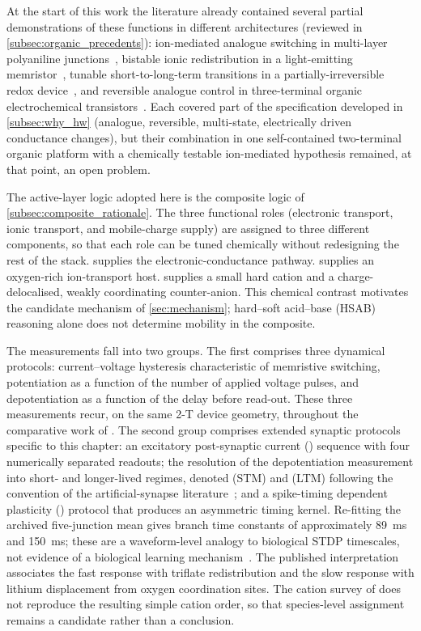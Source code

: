 \documentclass[12pt, twoside]{report}
\begin{document}
At the start of this work the literature already contained several partial demonstrations of these functions in different architectures (reviewed in \cref{subsec:organic_precedents}): ion-mediated analogue switching in multi-layer polyaniline junctions~\cite{Erokhin2005, Smerieri2008, Berzina2009}, bistable ionic redistribution in a light-emitting memristor~\cite{Zakhidov2010}, tunable short-to-long-term transitions in a partially-irreversible redox device~\cite{Liu2016, Heremans2011}, and reversible analogue control in three-terminal organic electrochemical transistors~\cite{Gkoupidenis2015, Xu2016, VanDeBurgt2017, Fuller2019}. Each covered part of the specification developed in \cref{subsec:why_hw} (analogue, reversible, multi-state, electrically driven conductance changes), but their combination in one self-contained two-terminal organic platform with a chemically testable ion-mediated hypothesis remained, at that point, an open problem.

The active-layer logic adopted here is the composite logic of \cref{subsec:composite_rationale}. The three functional roles (electronic transport, ionic transport, and mobile-charge supply) are assigned to three different components, so that each role can be tuned chemically without redesigning the rest of the stack. \SY{} supplies the electronic-conductance pathway. \Hybrane{} supplies an oxygen-rich ion-transport host. \LiTf{} supplies a small hard cation and a charge-delocalised, weakly coordinating counter-anion. This chemical contrast motivates the candidate mechanism of \cref{sec:mechanism}; hard--soft acid--base (HSAB) reasoning alone does not determine mobility in the composite.

The measurements fall into two groups. The first comprises three dynamical protocols: current--voltage hysteresis characteristic of memristive switching, potentiation as a function of the number of applied voltage pulses, and depotentiation as a function of the delay before read-out. These three measurements recur, on the same 2-T device geometry, throughout the comparative work of . The second group comprises extended synaptic protocols specific to this chapter: an excitatory post-synaptic current (\EPSC{}) sequence with four numerically separated readouts; the resolution of the depotentiation measurement into short- and longer-lived regimes, denoted \STM{} (STM) and \LTM{} (LTM) following the convention of the artificial-synapse literature~\cite{Kim2018,VanDeBurgt2018}; and a spike-timing dependent plasticity (\STDP{}) protocol that produces an asymmetric timing kernel. Re-fitting the archived five-junction mean gives branch time constants of approximately \SI{89}{\milli\second} and \SI{150}{\milli\second}; these are a waveform-level analogy to biological STDP timescales, not evidence of a biological learning mechanism~\cite{Bi1998,Kuzum2013}. The published interpretation associates the fast response with triflate redistribution and the slow response with lithium displacement from oxygen coordination sites. The cation survey of  does not reproduce the resulting simple cation order, so that species-level assignment remains a candidate rather than a conclusion.
\end{document}
